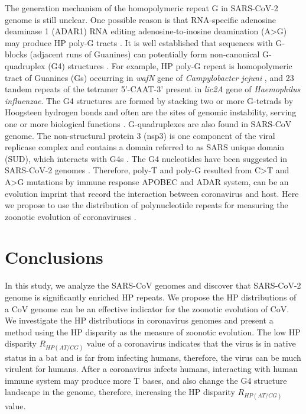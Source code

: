 \documentclass{article}
\numberwithin{equation}{section}
\begin{document}
The generation mechanism of the homopolymeric repeat G in SARS-CoV-2 genome is still unclear. One possible reason is that RNA-specific adenosine deaminase 1 (ADAR1) RNA editing adenosine-to-inosine deamination (A>G) may produce HP poly-G tracts \citep{picardi2022detection}. It is well established that sequences with G-blocks (adjacent runs of Guanines) can potentially form non-canonical G-quadruplex (G4) structures \citep{choi2011conformational,metifiot2014g}. For example, HP poly-G repeat is homopolymeric tract of Guanines (Gs) occurring in \textit{wafN} gene of \textit{Campylobacter jejuni} \citep{linton2000phase}, and 23 tandem repeats of the tetramer 5'-CAAT-3' present in \textit{lic2A} gene of \textit{Haemophilus influenzae}. The G4 structures are formed by stacking two or more G-tetrads by Hoogsteen hydrogen bonds and often are the sites of genomic instability, serving one or more biological functions \citep{bochman2012dna,chen2012sequence}. G-quadruplexes are also found in SARS-CoV genome. The non-structural protein 3 (nsp3) is one component of the viral replicase complex and contains a domain referred to as SARS unique domain (SUD), which interacts with G4s \citep{tan2009sars,kusov2015g}. The G4 nucleotides have been suggested in SARS-CoV-2 genomes \citep{frick2020molecular,ji2020discovery,zhang2020whole}. Therefore, poly-T and poly-G resulted from C>T and A>G mutations by immune response APOBEC and ADAR system, can be an evolution imprint that record the interaction between coronavirus and host. Here we propose to use the distribution of polynucleotide repeats for measuring the zoonotic evolution of coronaviruses \citep{hu2017discovery}. 

\section{Conclusions}
In this study, we analyze the SARS-CoV genomes and discover that SARS-CoV-2 genome is significantly enriched HP repeats. We propose the HP distributions of a CoV genome can be an effective indicator for the zoonotic evolution of CoV. We investigate the HP distributions in coronavirus genomes and present a method using the HP disparity as the measure of zoonotic evolution. The low HP disparity $R_{HP(AT/CG)}$ value of a coronavirus indicates that the virus is in native status in a bat and is far from infecting humans, therefore, the virus can be much virulent for humans. After a coronavirus infects humans, interacting with human immune system may produce more T bases, and also change the G4 structure landscape in the genome, therefore, increasing the HP disparity $R_{HP(AT/CG)}$ value.
\end{document}
